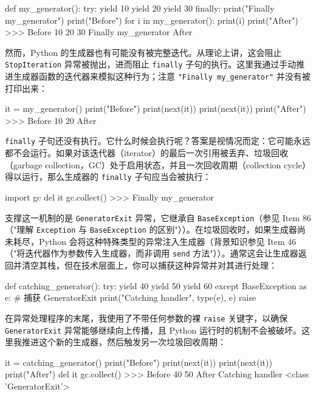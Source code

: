 \begin{codebox}[python]
def my_generator():
    try:
        yield 10
        yield 20
        yield 30
    finally:
        print("Finally my_generator")
print("Before")
for i in my_generator():
    print(i)
print("After")
>>>
Before
10
20
30
Finally my_generator
After
\end{codebox}

然而，Python 的生成器也有可能没有被完整迭代。从理论上讲，这会阻止 \texttt{StopIteration} 异常被抛出，进而阻止 \texttt{finally} 子句的执行。这里我通过手动推进生成器函数的迭代器来模拟这种行为；注意 \texttt{"Finally my\_generator"} 并没有被打印出来：

\begin{codebox}[python]
it = my_generator()
print("Before")
print(next(it))
print(next(it))
print("After")
>>>
Before
10
20
After
\end{codebox}

\texttt{finally} 子句还没有执行。它什么时候会执行呢？答案是视情况而定：它可能永远都不会运行。如果对该迭代器（iterator）的最后一次引用被丢弃、垃圾回收（garbage collection，GC）处于启用状态，并且一次回收周期（collection cycle）得以运行，那么生成器的 \texttt{finally} 子句应当会被执行：

\begin{codebox}[python]
import gc
del it
gc.collect()
>>>
Finally my_generator
\end{codebox}

支撑这一机制的是 \texttt{GeneratorExit} 异常，它继承自 \texttt{BaseException}（参见 Item 86（"理解 \texttt{Exception} 与 \texttt{BaseException} 的区别"））。在垃圾回收时，如果生成器尚未耗尽，Python 会将这种特殊类型的异常注入生成器（背景知识参见 Item 46（"将迭代器作为参数传入生成器，而非调用 \texttt{send} 方法"））。通常这会让生成器返回并清空其栈，但在技术层面上，你可以捕获这种异常并对其进行处理：

\begin{codebox}[python]
def catching_generator():
    try:
        yield 40
        yield 50
        yield 60
    except BaseException as e:  # 捕获 GeneratorExit
        print("Catching handler", type(e), e)
        raise
\end{codebox}

在异常处理程序的末尾，我使用了不带任何参数的裸 \texttt{raise} 关键字，以确保 \texttt{GeneratorExit} 异常能够继续向上传播，且 Python 运行时的机制不会被破坏。这里我推进这个新的生成器，然后触发另一次垃圾回收周期：

\begin{codebox}[python]
it = catching_generator()
print("Before")
print(next(it))
print(next(it))
print("After")
del it
gc.collect()
>>>
Before
40
50
After
Catching handler <class 'GeneratorExit'>
\end{codebox}


